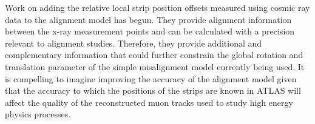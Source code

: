 Work on adding the relative local strip position offsets measured using cosmic ray data to the alignment model has begun. They provide alignment information between the x-ray measurement points and can be calculated with a precision relevant to alignment studies. Therefore, they provide additional and complementary information that could further constrain the global rotation and translation parameter of the simple misalignment model currently being used. It is compelling to imagine improving the accuracy of the alignment model given that the accuracy to which the positions of the strips are known in ATLAS will affect the quality of the reconstructed muon tracks used to study high energy physics processes.


